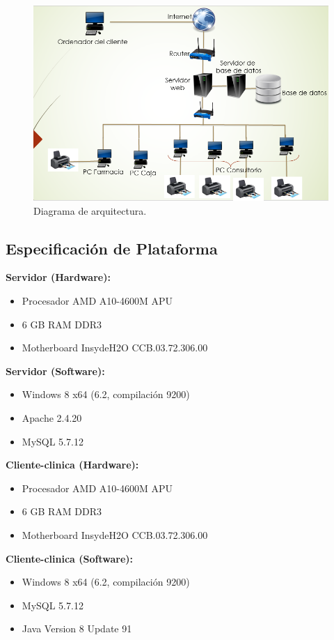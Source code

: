 	\begin{figure}[htbp!]
		\centering
			\includegraphics[width=1.15\textwidth]{images/mod_fis3.png}
		\caption{Diagrama de arquitectura.}
	\end{figure}



\subsection{Especificación de Plataforma}

\bfseries Servidor (Hardware): \mdseries
\begin{itemize}
\item Procesador AMD A10-4600M APU
\item 6 GB RAM DDR3
\item Motherboard InsydeH2O CCB.03.72.306.00
\end{itemize}

\bfseries Servidor (Software): \mdseries
\begin{itemize}
\item Windows 8 x64 (6.2, compilaci\'on 9200)
\item Apache 2.4.20
\item MySQL 5.7.12
\end{itemize}

\bfseries Cliente-clinica (Hardware): \mdseries
\begin{itemize}
\item Procesador AMD A10-4600M APU
\item 6 GB RAM DDR3
\item Motherboard InsydeH2O CCB.03.72.306.00
\end{itemize}

\bfseries Cliente-clinica (Software): \mdseries
\begin{itemize}
\item Windows 8 x64 (6.2, compilaci\'on 9200)
\item MySQL 5.7.12
\item Java Version 8 Update 91
\end{itemize}

